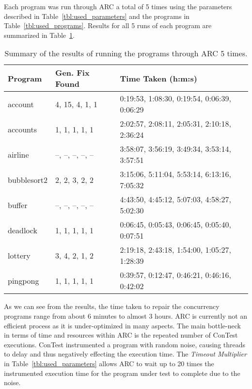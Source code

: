 Each program was run through ARC a total of 5 times using the parameters described in Table~\ref{tbl:used_parameters} and the programs in Table~\ref{tbl:used_programs}. Results for all 5 runs of each program are summarized in Table~\ref{tbl:summary_results}.

\begin{table}[t!]
\caption{Summary of the results of running the programs through ARC 5 times.}
\begin{center}
\lstset{basicstyle=\scriptsize}
\begin{tabular}{|l|l|l|}
\hline
\textbf{Program} & \textbf{Gen. Fix Found} & \textbf{Time Taken (h:m:s)}\\
\hline
account & 4, 15, 4, 1, 1 & 0:19:53, 1:08:30, 0:19:54, 0:06:39, 0:06:29\\
\hline
accounts & 1, 1, 1, 1, 1 & 2:02:57, 2:08:11, 2:05:31, 2:10:18, 2:36:24\\
\hline
airline & --, --, --, --, -- & 3:58:07, 3:56:19, 3:49:34, 3:53:14, 3:57:51\\
\hline
bubblesort2 & 2, 2, 3, 2, 2 & 3:15:06, 5:11:04, 5:53:14, 6:13:16, 7:05:32 \\
\hline
buffer & --, --, --, --, -- & 4:43:50, 4:45:12, 5:07:03, 4:58:27, 5:02:30\\
\hline
deadlock & 1, 1, 1, 1, 1 & 0:06:45, 0:05:43, 0:06:45, 0:05:40, 0:07:51\\
\hline
lottery & 3, 4, 2, 1, 2 & 2:19:18, 2:43:18, 1:54:00, 1:05:27, 1:28:39\\
\hline
pingpong & 1, 1, 1, 1, 1 & 0:39:57, 0:12:47, 0:46:21, 0:46:16, 0:42:02\\
\hline
\end{tabular}
\label{tbl:summary_results}
\end{center}
\end{table}

As we can see from the results, the time taken to repair the concurrency programs range from about 6 minutes to almost 3 hours. ARC is currently not an efficient process as it is under-optimized in many aspects. The main bottle-neck in terms of time and resources within ARC is the repeated number of ConTest executions. ConTest instrumented a program with random noise, causing threads to delay and thus negatively effecting the execution time.  The \textit{Timeout Multiplier} in Table~\ref{tbl:used_parameters} allows ARC to wait up to 20 times the instrumented execution time for the program under test to complete due to the noise.

